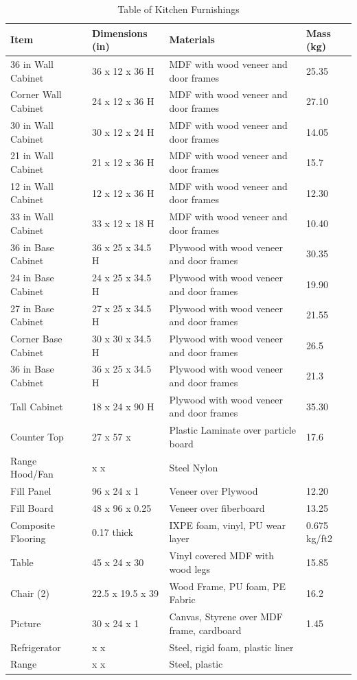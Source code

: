 \documentclass[12pt,oneside]{book}
\begin{document}
\begin{table}[!ht]
	\centering
	\caption{Table of Kitchen Furnishings}
	\label{tab:BRFuel}
	\begin{tabular}{llll}
		\toprule[1.5pt]
		Item 				& Dimensions (in) 	& Materials 										& Mass (kg)  \\
		\midrule
		36 in Wall Cabinet 	&  36 x 12 x 36 H	& MDF with wood veneer and door frames 				& 25.35 \\
		Corner Wall Cabinet &  24 x 12 x 36 H	& MDF with wood veneer and door frames   			& 27.10 \\
		30 in Wall Cabinet  &  30 x 12 x 24 H	& MDF with wood veneer and door frames 				& 14.05 \\
		21 in Wall Cabinet  &  21 x 12 x 36 H   & MDF with wood veneer and door frames              & 15.7  \\
		12 in Wall Cabinet  &  12 x 12 x 36 H 	& MDF with wood veneer and door frames 				& 12.30  \\	
		33 in Wall Cabinet 	&  33 x 12 x 18 H	& MDF with wood veneer and door frames 				& 10.40   \\
		36 in Base Cabinet	&  36 x 25 x 34.5 H	& Plywood with wood veneer and door frames			& 30.35    \\	
		24 in Base Cabinet	&  24 x 25 x 34.5 H	& Plywood with wood veneer and door frames			& 19.90    \\
		27 in Base Cabinet	&  27 x 25 x 34.5 H	& Plywood with wood veneer and door frames			& 21.55   \\
		Corner Base Cabinet	&  30 x 30 x 34.5 H	& Plywood with wood veneer and door frames			& 26.5    \\
		36 in Base Cabinet	&  36 x 25 x 34.5 H	& Plywood with wood veneer and door frames			& 21.3    \\
		Tall Cabinet		&  18 x 24 x 90 H	& Plywood with wood veneer and door frames			& 35.30    \\
		Counter Top			&  27 x 57 x 		& Plastic Laminate over particle board          	& 17.6    \\
		Range Hood/Fan		&   x  x 			& Steel Nylon										&      \\
		Fill Panel			&  96 x 24 x 1		& Veneer over Plywood 								& 12.20  \\
		Fill Board		 	&  48 x 96 x 0.25  	& Veneer over fiberboard    						& 13.25   \\
		Composite Flooring	&   0.17 thick 		& IXPE foam, vinyl, PU wear layer					&	0.675 kg/ft2  \\
		Table				& 45 x 24 x 30		& Vinyl covered MDF with wood legs					& 	15.85 \\
		Chair (2)			& 22.5 x 19.5 x 39  & Wood Frame, PU foam, PE Fabric 					&  16.2  \\
		Picture 			& 30 x 24 x 1		& Canvas, Styrene over MDF frame, cardboard 		&  1.45  \\
		Refrigerator		&  x  x             & Steel, rigid foam, plastic liner					&        \\
		Range 				&  x   x 			& Steel, plastic 									&        \\
		\bottomrule[1.25pt]
	\end{tabular}
\end{table}
\end{document}
